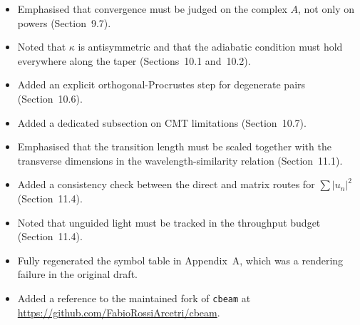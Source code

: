 \documentclass[11pt,a4paper]{article}
\begin{document}
\begin{itemize}
\item Emphasised that convergence must be judged on the complex $A$, not only on powers (Section~9.7).
\item Noted that $\kappa$ is antisymmetric and that the adiabatic condition must hold everywhere along the taper (Sections~10.1 and~10.2).
\item Added an explicit orthogonal-Procrustes step for degenerate pairs (Section~10.6).
\item Added a dedicated subsection on CMT limitations (Section~10.7).
\item Emphasised that the transition length must be scaled together with the transverse dimensions in the wavelength-similarity relation (Section~11.1).
\item Added a consistency check between the direct and matrix routes for $\sum |u_n|^2$ (Section~11.4).
\item Noted that unguided light must be tracked in the throughput budget (Section~11.4).
\item Fully regenerated the symbol table in Appendix~A, which was a rendering failure in the original draft.
\item Added a reference to the maintained fork of \texttt{cbeam} at \url{https://github.com/FabioRossiArcetri/cbeam}.
\end{itemize}
\end{document}
